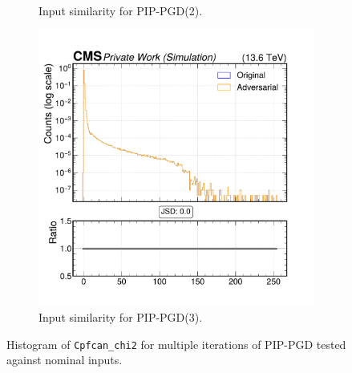 \begin{figure}[h]
\begin{subfigure}[t]{0.32\textwidth}
    \caption*{Input similarity for PIP-PGD(2).}
  \end{subfigure}\hfill
  \begin{subfigure}[t]{0.32\textwidth}
    \includegraphics[width=\linewidth]{media/output/features/compare/combined_it_3/cmp_cpf_arr_Cpfcan_chi2.pdf}
    \caption*{Input similarity for PIP-PGD(3).}
  \end{subfigure}

  \caption*{Histogram of \texttt{Cpfcan\_chi2} for multiple iterations of PIP-PGD tested against nominal inputs.}
  \label{fig:combined_input_Cpfcan_chi2}
\end{figure}

